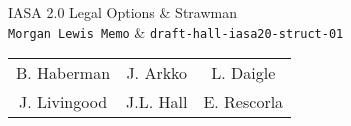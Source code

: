 \documentclass[helvetica]{seminar}
\begin{document}
\begin{slide}
\begin{center}
\vspace{.5 in}
\LARGE{{\bf}IASA 2.0 Legal Options \& Strawman\\{\small \verb^Morgan Lewis Memo^ \& \verb^draft-hall-iasa20-struct-01^}}\\
\vspace{.2in}
\large{
\begin{tabular}{ c c c }
B. Haberman & J. Arkko & L. Daigle \\
J. Livingood & J.L. Hall & E. Rescorla 
\end{tabular}
}
\end{center}
\end{slide}

\centerslidesfalse 
\end{document}
